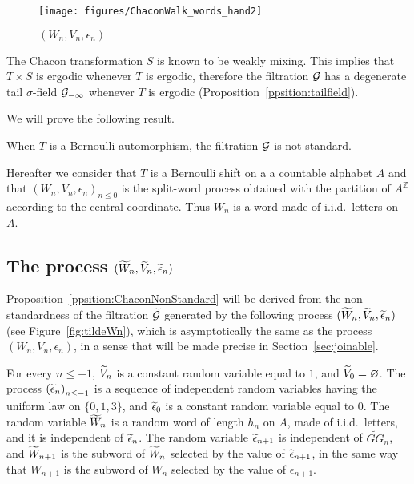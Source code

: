 \documentclass[12pt,a4paper]{article}
\begin{document}
\begin{figure}[!h]
\centering
	\texttt{[image: figures/ChaconWalk\_words\_hand2]}
\caption{$(W_n, V_n, \epsilon_n)$}
\label{fig:ChaconSplitWord}
\end{figure}

The Chacon transformation $S$ is known to be weakly mixing. 
This implies that $T \times S$ is ergodic whenever $T$ is ergodic, 
therefore the filtration $\mathcal{G}$ has a degenerate tail $\sigma$-field 
$\mathcal{G}_{-\infty}$ whenever $T$ is ergodic (Proposition~\ref{ppsition:tailfield}). 

We will prove the following result.

\begin{ppsition}\label{ppsition:ChaconNonStandard}
When $T$ is a Bernoulli automorphism, the filtration $\mathcal{G}$ is not standard.
\end{ppsition}

Hereafter we consider that $T$ is a Bernoulli shift on a 
a countable alphabet $A$ and that  ${(W_n, V_n, \epsilon_n)}_{n \leq 0}$ 
is the split-word process obtained with the partition of 
$A^{\mathbb{Z}}$ according to the central coordinate. 
Thus $W_n$ is a word made of i.i.d.\ letters on $A$. 

\subsection{The process $(\widetilde{W}_n, \widetilde{V}_n, \widetilde{\epsilon}_n)$}


Proposition~\ref{ppsition:ChaconNonStandard} will be derived from the 
non-standardness of the filtration $\widetilde{\mathcal{G}}$ generated by 
the following process $(\widetilde{W}_n, \widetilde{V}_n, \widetilde{\epsilon}_n)$ 
(see Figure~\ref{fig:tildeWn}), 
which is asymptotically the same as the process $(W_n, V_n, \epsilon_n)$, 
in a sense that will be made precise in Section~\ref{sec:joinable}.


For every $n \leq -1$, $\widetilde{V}_n$ is a constant random variable equal to $1$, 
and $\widetilde{V}_0=\varnothing$. 
The process ${(\widetilde{\epsilon}_n)}_{n \leq -1}$ is a sequence of independent random 
variables having the uniform law on $\{0,1,3\}$, and $\widetilde{\epsilon}_0$ is a 
constant random variable equal to $0$. 
The random variable $\widetilde{W}_n$ is a random word of length $h_n$ on $A$, 
made of i.i.d.\ letters, and  it is 
independent of $\widetilde{\epsilon}_n$. 
The random variable $\widetilde{\epsilon}_{n+1}$ is independent of $\widetilde{GG}_n$, and 
$\widetilde{W}_{n+1}$ is the subword of $\widetilde{W}_n$ selected by the value of $\widetilde{\epsilon}_{n+1}$, 
in the same way that $W_{n+1}$ is the subword of $W_n$ selected by the value of $\epsilon_{n+1}$.
\end{document}
